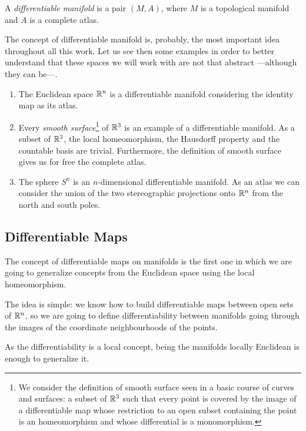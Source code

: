 \begin{definition}
	A \emph{differentiable manifold} is a pair $(M, A)$, where $M$ is a topological manifold and $A$ is a complete atlas.
\end{definition}

\begin{example}
	The concept of differentiable manifold is, probably, the most important idea throughout all this work. Let us see then some examples in order to better understand that these spaces we will work with are not that abstract ---although they can be---.
	
	\begin{enumerate}
		\item The Euclidean space $\mathbb{R}^n$ is a differentiable manifold considering the identity map as its atlas.
		\item Every \emph{smooth surface}\footnote{We consider the definition of smooth surface seen in a basic course of curves and surfaces: a subset of $\mathbb{R}^3$ such that every point is covered by the image of a differentiable map whose restriction to an open subset containing the point is an homeomorphism and whose differential is a monomorphism.} of $\mathbb{R}^3$ is an example of a differentiable manifold. As a subset of $\mathbb{R}^3$, the local homeomorphism, the Hausdorff property and the countable basis are trivial. Furthermore, the definition of smooth surface gives us for free the complete atlas.
		\item The sphere $S^n$ is an $n$-dimensional differentiable manifold. As an atlas we can consider the union of the two stereographic projections onto $\mathbb{R}^n$ from the north and south poles.
	\end{enumerate}
\end{example}

\subsection{Differentiable Maps}

The concept of differentiable maps on manifolds is the first one in which we are going to generalize concepts from the Euclidean space using the local homeomorphism.

The idea is simple: we know how to build differentiable maps between open sets of $\mathbb{R}^n$, so we are going to define differentiability between manifolds going through the images of the coordinate neighbourhoods of the points.

As the differentiability is a local concept, being the manifolds locally Euclidean is enough to generalize it.

